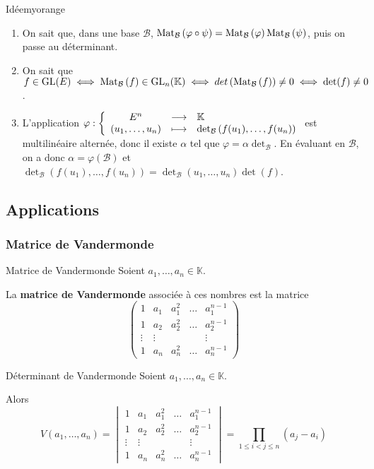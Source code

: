     \begin{demo}{Idée}{myorange}
        \begin{enumerate}
            \item On sait que, dans une base $\mathcal{B}$, $\text{Mat}_{\mathcal{B}}\left(\varphi \circ \psi\right) = \text{Mat}_{\mathcal{B}}\left(\varphi\right) \text{Mat}_{\mathcal{B}}\left(\psi\right)$, puis on passe au déterminant.
            \item On sait que $f \in \operatorname{GL}(E) \iff \text{Mat}_{\mathcal{B}}\left(f\right) \in \operatorname{GL}_n(\mathbb{K}) \iff det\left(\text{Mat}_{\mathcal{B}}\left(f\right)\right) \neq 0 \iff \det(f) \neq 0$.
            \item L’application $\fonction{\varphi}{E^n}{\mathbb{K}}{(u_1,\ldots,u_n)}{\det_{\mathcal{B}}\left(f(u_1), \ldots, f(u_n)\right)}$ est multilinéaire alternée, donc il existe $\alpha$ tel que $\varphi = \alpha \det_{\mathcal{B}}$. En évaluant en $\mathcal{B}$, on a donc $\alpha = \varphi(\mathcal{B})$ et $\det_{\mathcal{B}}(f(u_1), \ldots, f(u_n)) = \det_{\mathcal{B}}(u_1,\ldots,u_n) \det(f)$.
        \end{enumerate}
    \end{demo}

\subsection{Applications}

    \subsubsection{Matrice de Vandermonde}

    \begin{defi}{Matrice de Vandermonde}{}
        Soient $a_1,\ldots,a_n \in \mathbb{K}$.
        
        La \textbf{matrice de Vandermonde} associée à ces nombres est la matrice 
        \[ \begin{pmatrix}
            1 & a_1 & a_1^2 & \ldots & a_1^{n-1} \\
            1 & a_2 & a_2^2 & \ldots & a_2^{n-1} \\
            \vdots & \vdots &  &  & \vdots \\
            1 & a_n & a_n^2 & \ldots & a_n^{n-1} 
        \end{pmatrix} \]
    \end{defi}

    \begin{theo}{Déterminant de Vandermonde}{}
        Soient $a_1,\ldots,a_n \in \mathbb{K}$.
        
        Alors \[ V(a_1,\ldots,a_n) = \begin{vmatrix}
            1 & a_1 & a_1^2 & \ldots & a_1^{n-1} \\
            1 & a_2 & a_2^2 & \ldots & a_2^{n-1} \\
            \vdots & \vdots &  &  & \vdots \\
            1 & a_n & a_n^2 & \ldots & a_n^{n-1} 
        \end{vmatrix} = \prod\limits_{1 \leq i < j \leq n} (a_j - a_i) \]
    \end{theo}

